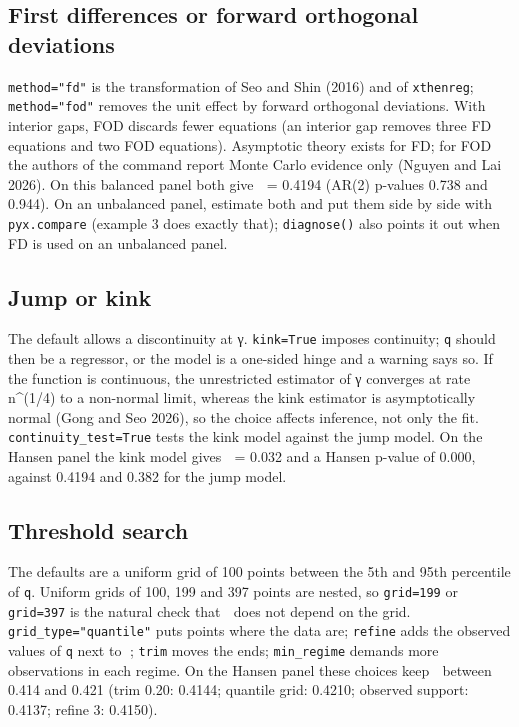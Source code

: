 \documentclass[
  10.5pt,
  a4paper,
]{article}
\begin{document}
\subsection{First differences or forward orthogonal
deviations}\label{first-differences-or-forward-orthogonal-deviations}

\texttt{method="fd"} is the transformation of Seo and Shin (2016) and of
\texttt{xthenreg}; \texttt{method="fod"} removes the unit effect by
forward orthogonal deviations. With interior gaps, FOD discards fewer
equations (an interior gap removes three FD equations and two FOD
equations). Asymptotic theory exists for FD; for FOD the authors of the
command report Monte Carlo evidence only (Nguyen and Lai 2026). On this
balanced panel both give  = 0.4194 (AR(2) p-values 0.738 and 0.944). On
an unbalanced panel, estimate both and put them side by side with
\texttt{pyx.compare} (example 3 does exactly that); \texttt{diagnose()}
also points it out when FD is used on an unbalanced panel.

\subsection{Jump or kink}\label{jump-or-kink}

The default allows a discontinuity at γ. \texttt{kink=True} imposes
continuity; \texttt{q} should then be a regressor, or the model is a
one-sided hinge and a warning says so. If the function is continuous,
the unrestricted estimator of γ converges at rate n\^{}(1/4) to a
non-normal limit, whereas the kink estimator is asymptotically normal
(Gong and Seo 2026), so the choice affects inference, not only the fit.
\texttt{continuity\_test=True} tests the kink model against the jump
model. On the Hansen panel the kink model gives  = 0.032 and a Hansen
p-value of 0.000, against 0.4194 and 0.382 for the jump model.

\subsection{Threshold search}\label{threshold-search}

The defaults are a uniform grid of 100 points between the 5th and 95th
percentile of \texttt{q}. Uniform grids of 100, 199 and 397 points are
nested, so \texttt{grid=199} or \texttt{grid=397} is the natural check
that  does not depend on the grid. \texttt{grid\_type="quantile"} puts
points where the data are; \texttt{refine} adds the observed values of
\texttt{q} next to ; \texttt{trim} moves the ends; \texttt{min\_regime}
demands more observations in each regime. On the Hansen panel these
choices keep  between 0.414 and 0.421 (trim 0.20: 0.4144; quantile
grid: 0.4210; observed support: 0.4137; refine 3: 0.4150).
\end{document}
